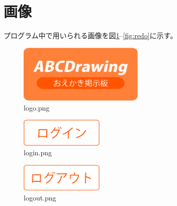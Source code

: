 \documentclass[a4j,titlepage]{jsarticle}
\begin{document}



















\section{画像}
プログラム中で用いられる画像を図\ref{fig:logo}--\ref{fig:redo}に示す。

\begin{figure}[H]
  \centering
  \includegraphics[width=6cm]{../public/image/logo.png}
  \caption{logo.png}
  \label{fig:logo}
\end{figure}

\begin{figure}[H]
  \centering
  \includegraphics[width=4cm]{../public/image/login.png}
  \caption{login.png}
  \label{fig:login}
\end{figure}

\begin{figure}[H]
  \centering
  \includegraphics[width=4cm]{../public/image/logout.png}
  \caption{logout.png}
  \label{fig:logout}
\end{figure}
\end{document}
